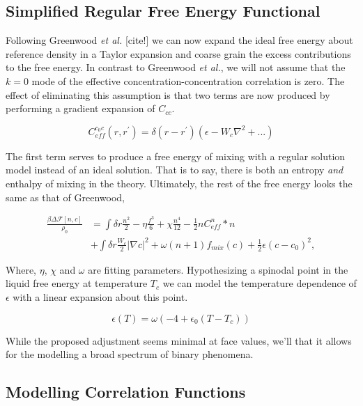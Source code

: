 \documentclass[showkeys, prb, reprint]{revtex4-1}
\newcommand{\F}{\mathcal{F}}
\renewcommand{\d}{\delta}
\renewcommand{\l}{\left}
\renewcommand{\r}{\right}
\newcommand{\f}{\frac}
\begin{document}
\subsection{Simplified Regular Free Energy Functional}

Following Greenwood \textit{et al.} [cite!] we can now expand the ideal free energy about reference density in a Taylor expansion and coarse grain the excess contributions to the free energy. In contrast to Greenwood \textit{et al.}, we will not assume that the $k = 0$ mode of the effective concentration-concentration correlation is zero. The effect of eliminating this assumption is that two terms are now produced by performing a gradient expansion of $C_{cc}$.

\begin{equation}
	C^{c_0 c}_{eff}(r, r^\prime) = \delta(r - r^\prime)\l(\epsilon  - W_c \nabla^2 + ... \r)
\end{equation}

The first term serves to produce a free energy of mixing with a regular solution model instead of an ideal solution. That is to say, there is both an entropy \textit{and} enthalpy of mixing in the theory. Ultimately, the rest of the free energy looks the same as that of Greenwood,

\begin{align}
	\f{\beta \Delta \F[n, c]}{\rho_0} &= \int \d r \f{n^2}{2} - \eta \f{f^3}{6} + \chi \f{n^4}{12} -\f{1}{2} n C^{n}_{eff} \ast n \\
	&+ \int \d r \f{W_c}{2} \l\vert\nabla c\r\vert^2 + \omega (n + 1) f_{mix}(c) + \f{1}{2} \epsilon (c- c_0)^2, \nonumber
\end{align}

Where, $\eta$, $\chi$ and $\omega$ are fitting parameters. Hypothesizing a spinodal point in the liquid free energy at temperature $T_c$ we can model the temperature dependence of $\epsilon$ with a linear expansion about this point. 

\begin{equation}
	\epsilon(T) = \omega \l( -4 + \epsilon_0 \l(T - T_c\r)\r) 
\end{equation}

While the proposed adjustment seems minimal at face values, we'll that it allows for the modelling a broad spectrum of binary phenomena.

\subsection{Modelling Correlation Functions}
\end{document}
